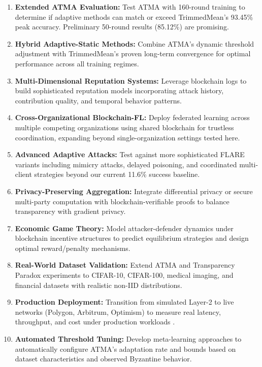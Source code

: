 \documentclass{ieeeaccess}
\begin{document}
\begin{enumerate}
    \item \textbf{Extended ATMA Evaluation:} Test ATMA with 160-round training to determine if adaptive methods can match or exceed TrimmedMean's 93.45\% peak accuracy. Preliminary 50-round results (85.12\%) are promising.
    
    \item \textbf{Hybrid Adaptive-Static Methods:} Combine ATMA's dynamic threshold adjustment with TrimmedMean's proven long-term convergence for optimal performance across all training regimes.
    
    \item \textbf{Multi-Dimensional Reputation Systems:} Leverage blockchain logs to build sophisticated reputation models incorporating attack history, contribution quality, and temporal behavior patterns.
    
    \item \textbf{Cross-Organizational Blockchain-FL:} Deploy federated learning across multiple competing organizations using shared blockchain for trustless coordination, expanding beyond single-organization settings tested here.
    
    \item \textbf{Advanced Adaptive Attacks:} Test against more sophisticated FLARE variants including mimicry attacks, delayed poisoning, and coordinated multi-client strategies beyond our current 11.6\% success baseline.
    
    \item \textbf{Privacy-Preserving Aggregation:} Integrate differential privacy or secure multi-party computation \cite{mugunthan2020smpcchain} with blockchain-verifiable proofs to balance transparency with gradient privacy.
    
    \item \textbf{Economic Game Theory:} Model attacker-defender dynamics under blockchain incentive structures to predict equilibrium strategies and design optimal reward/penalty mechanisms.
    
    \item \textbf{Real-World Dataset Validation:} Extend ATMA and Transparency Paradox experiments to CIFAR-10, CIFAR-100, medical imaging, and financial datasets with realistic non-IID distributions.
    
    \item \textbf{Production Deployment:} Transition from simulated Layer-2 to live networks (Polygon, Arbitrum, Optimism) to measure real latency, throughput, and cost under production workloads \cite{wu2024blockchain}.
    
    \item \textbf{Automated Threshold Tuning:} Develop meta-learning approaches to automatically configure ATMA's adaptation rate and bounds based on dataset characteristics and observed Byzantine behavior.
\end{enumerate}
\end{document}
